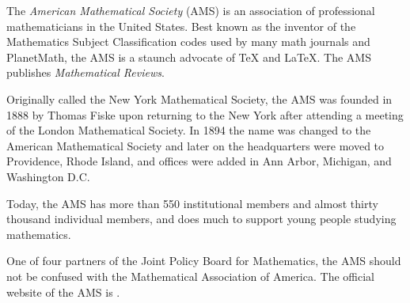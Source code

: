 \documentclass[12pt]{article}
\begin{document}

The {\em American Mathematical Society} (AMS) is an association of professional mathematicians in the United States. Best known as the inventor of the Mathematics Subject Classification codes used by many math journals and PlanetMath, the AMS is a staunch advocate of \TeX{} and \LaTeX{}. The AMS publishes {\it Mathematical Reviews}.

Originally called the New York Mathematical Society, the AMS was founded in 1888 by Thomas Fiske upon returning to the New York after attending a meeting of the London Mathematical Society. In 1894 the name was changed to the American Mathematical Society and later on the headquarters were moved to Providence, Rhode Island, and offices were added in Ann Arbor, Michigan, and Washington D.C.

Today, the AMS has more than 550 institutional members and almost thirty thousand individual members, and does much to support young people studying mathematics.

One of four partners of the Joint Policy Board for Mathematics, the AMS should not be confused with the Mathematical Association of America. The official website of the AMS is .
\end{document}
